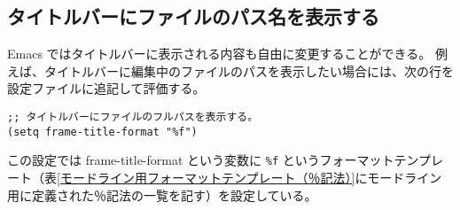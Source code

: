 \subsection{タイトルバーにファイルのパス名を表示する}
Emacs ではタイトルバーに表示される内容も自由に変更することができる。
例えば、タイトルバーに編集中のファイルのパスを表示したい場合には、次の行を設定ファイルに追記して評価する。
\begin{mdframed}[roundcorner=0.50zw,leftmargin=3.00zw,rightmargin=3.00zw,skipabove=0.40zw,skipbelow=0.40zw,innertopmargin=4.00pt,innerbottommargin=4.00pt,innerleftmargin=5.00pt,innerrightmargin=5.00pt,linecolor=gray!020,linewidth=0.50pt,backgroundcolor=gray!20]
\begin{verbatim}
;; タイトルバーにファイルのフルパスを表示する。
(setq frame-title-format "%f")
\end{verbatim}
\end{mdframed}
この設定では frame-title-format という変数に \texttt{\%{}f} というフォーマットテンプレート（表\ref{モードライン用フォーマットテンプレート（％記法）}にモードライン用に定義された％記法の一覧を記す）を設定している。
